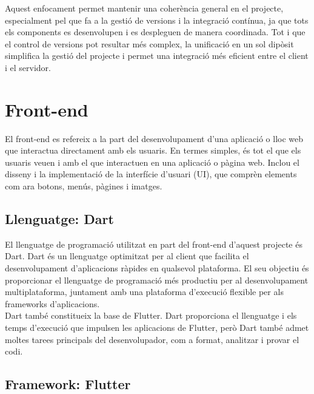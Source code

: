 \documentclass[a4paper,12pt,twoside]{ThesisStyle}
\begin{document}
Aquest enfocament permet mantenir una coherència general en el projecte, especialment pel que fa a la gestió de versions i la integració contínua, ja que tots els components es desenvolupen i es despleguen de manera coordinada. Tot i que el control de versions pot resultar més complex, la unificació en un sol dipòsit simplifica la gestió del projecte i permet una integració més eficient entre el client i el servidor.




\section{Front-end}
\label{subsec: Front-end}

El front-end es refereix a la part del desenvolupament d'una aplicació o lloc web que interactua directament amb els usuaris. En termes simples, és tot el que els usuaris veuen i amb el que interactuen en una aplicació o pàgina web. Inclou el disseny i la implementació de la interfície d'usuari (UI), que comprèn elements com ara botons, menús, pàgines i imatges.


\subsection{Llenguatge: Dart}
\label{subsec:Llenguatge: Dart}

El llenguatge de programació utilitzat en part del front-end d'aquest projecte és Dart. Dart és un llenguatge optimitzat per al client que facilita el desenvolupament d'aplicacions ràpides en qualsevol plataforma. El seu objectiu és proporcionar el llenguatge de programació més productiu per al desenvolupament multiplataforma, juntament amb una plataforma d'execució flexible per als frameworks d'aplicacions.\\

Dart també constitueix la base de Flutter. Dart proporciona el llenguatge i els temps d'execució que impulsen les aplicacions de Flutter, però Dart també admet moltes tarees principals del desenvolupador, com a format, analitzar i provar el codi.


\subsection{Framework: Flutter}
\label{subsec:Framework: Flutter}
\end{document}
